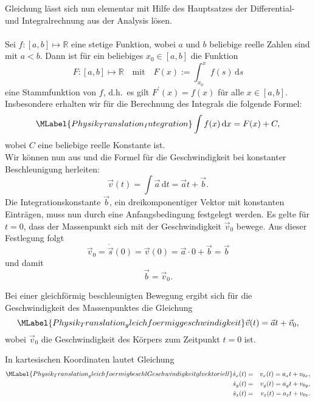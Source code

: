 \begin{MContent}
     Gleichung  l\"asst sich nun elementar mit Hilfe des Hauptsatzes der Differential- und Integralrechnung aus der Analysis l\"osen.\\
     
     \\
     Sei $f:[a,b]\mapsto\mathbb{R}$ eine stetige Funktion, wobei $a$ und $b$ beliebige reelle Zahlen sind mit $a<b$. Dann ist f\"ur ein beliebiges $x_0\in[a,b]$ die Funktion
     $$
     F:[a,b]\mapsto\mathbb{R}\quad\text{mit}\quad F(x):=\int_{x_0}^x f(s)\,\textrm{d}s
     $$ eine Stammfunktion von $f$, d.h.~es gilt $F^{\prime}(x)=f(x)$ f\"ur alle $x\in [a,b]$. Insbesondere erhalten wir f\"ur die Berechnung des Integrals die folgende Formel:
     \begin{equation}\MLabel{Physik_Translation_Integration}
     \int f(x)\,\textrm{d}x=F(x)+C,
     \end{equation} wobei $C$ eine beliebige reelle Konstante ist.\\
     
     
     Wir k\"onnen nun aus  und  die Formel f\"ur die Geschwindigkeit bei konstanter Beschleunigung herleiten:
     $$
          \vec{v}(t)=\int \vec{a}\,\textrm{d}t=\vec{a}t + \vec{b}.
     $$
     Die Integrationskonstante $\vec{b}$, ein dreikomponentiger Vektor mit konstanten Eintr\"agen, muss nun durch eine Anfangsbedingung festgelegt werden. Es gelte f\"ur $t=0$, dass der Massenpunkt sich mit der Geschwindigkeit $\vec{v}_0$ bewege. Aus dieser Festlegung folgt
     $$
     \vec{v}_0=\dot{\vec{s}}(0)=\vec{v}(0)=\vec{a}\cdot 0 + \vec{b}=\vec{b}
     $$ und damit 
     $$
     \vec{b}=\vec{v}_0.
     $$
     
     \begin{MInfo}
     Bei einer gleichf\"ormig beschleunigten Bewegung ergibt sich f\"ur die Geschwindigkeit des Massenpunktes die Gleichung 
     \begin{equation}
          \MLabel{Physik_Translation_gleichfoermiggeschwindigkeit}
          \vec{v}(t)=\vec{a}t + \vec{v}_0,
     \end{equation}
     wobei $\vec{v}_0$ die Geschwindigkeit des K\"orpers zum Zeitpunkt $t=0$ ist.
     \end{MInfo}
     
     In kartesischen Koordinaten lautet Gleichung  
     \begin{eqnarray}
          \MLabel{Physik_Translation_ gleichfoermigbeschlGeschwindigkeitglvektoriell}
          \nonumber\dot{s}_x(t) &=&v_x(t)=a_xt+v_{0x},\\
          \dot{s}_y(t)&=&v_y(t)=a_yt+v_{0y},\\
          \nonumber\dot{s}_z(t)&=&v_z(t)=a_zt+v_{0z}.
     \end{eqnarray}
     

\end{MContent}
